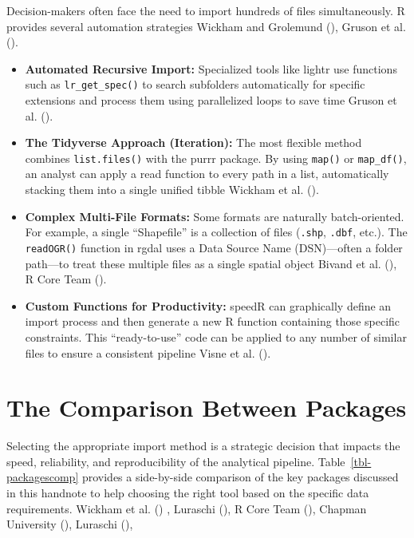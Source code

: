 \documentclass[
  doc,
  longtable,
  a4paper,
  nolmodern,
  notxfonts,
  notimes,
  colorlinks=true,linkcolor=blue,citecolor=blue,urlcolor=blue]{apa7}
\begin{document}
Decision-makers often face the need to import hundreds of files
simultaneously. R provides several automation strategies Wickham and
Grolemund (), Gruson et al.
().

\begin{itemize}
\item
  \textbf{Automated Recursive Import:} Specialized tools like lightr use
  functions such as \texttt{lr\_get\_spec()} to search subfolders
  automatically for specific extensions and process them using
  parallelized loops to save time Gruson et al.
  ().
\item
  \textbf{The Tidyverse Approach (Iteration):} The most flexible method
  combines \texttt{list.files()} with the purrr package. By using
  \texttt{map()} or \texttt{map\_df()}, an analyst can apply a read
  function to every path in a list, automatically stacking them into a
  single unified tibble {Wickham et al.}
  ().
\item
  \textbf{Complex Multi-File Formats:} Some formats are naturally
  batch-oriented. For example, a single ``Shapefile'' is a collection of
  files (\texttt{.shp}, \texttt{.dbf}, etc.). The \texttt{readOGR()}
  function in rgdal uses a Data Source Name (DSN)---often a folder
  path---to treat these multiple files as a single spatial object Bivand
  et al. (), R Core Team
  ().
\item
  \textbf{Custom Functions for Productivity:} speedR can graphically
  define an import process and then generate a new R function containing
  those specific constraints. This ``ready-to-use'' code can be applied
  to any number of similar files to ensure a consistent pipeline Visne
  et al. ().
\end{itemize}

\section{The Comparison Between
Packages}\label{the-comparison-between-packages}

Selecting the appropriate import method is a strategic decision that
impacts the speed, reliability, and reproducibility of the analytical
pipeline. Table~\ref{tbl-packagescomp} provides a side-by-side
comparison of the key packages discussed in this handnote to help
choosing the right tool based on the specific data requirements.
{Wickham et al.} () , Luraschi
(), R Core Team
(), Chapman University
(), Luraschi
(),
\end{document}
